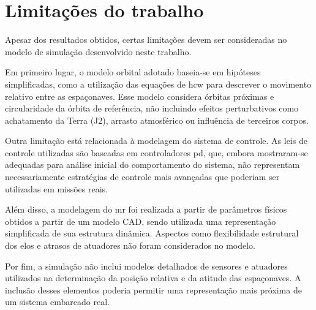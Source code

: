 \section{Limitações do trabalho}

Apesar dos resultados obtidos, certas limitações devem ser consideradas no modelo de simulação desenvolvido neste trabalho.

Em primeiro lugar, o modelo orbital adotado baseia-se em hipóteses simplificadas, como a utilização das equações de \gls{hcw} para descrever o movimento relativo entre as espaçonaves. 
Esse modelo considera órbitas próximas e circularidade da órbita de referência, não incluindo efeitos perturbativos como achatamento da Terra (J2), arrasto atmosférico ou influência de terceiros corpos.

Outra limitação está relacionada à modelagem do sistema de controle. 
As leis de controle utilizadas são baseadas em controladores \gls{pd}, que, embora mostraram-se adequadas para análise inicial do comportamento do sistema, não representam necessariamente estratégias de controle mais avançadas que poderiam ser utilizadas em missões reais.

Além disso, a modelagem do \gls{mr} foi realizada a partir de parâmetros físicos obtidos a partir de um modelo CAD, sendo utilizada uma representação simplificada de sua estrutura dinâmica. 
Aspectos como flexibilidade estrutural dos elos e atrasos de atuadores não foram considerados no modelo.

Por fim, a simulação não inclui modelos detalhados de sensores e atuadores utilizados na determinação da posição relativa e da atitude das espaçonaves. 
A inclusão desses elementos poderia permitir uma representação mais próxima de um sistema embarcado real.
